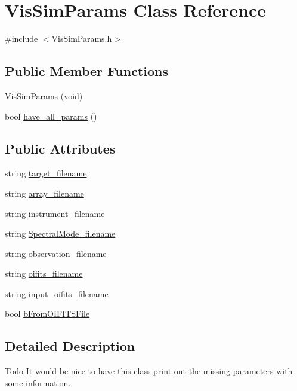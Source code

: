 \hypertarget{classVisSimParams}{
\section{VisSimParams Class Reference}
\label{classVisSimParams}
}


{\ttfamily \#include $<$VisSimParams.h$>$}

\subsection*{Public Member Functions}
\begin{DoxyCompactItemize}
\item 
\hyperlink{classVisSimParams_a3c730d9c8f400a34aade38dbc0b0a675}{VisSimParams} (void)
\item 
bool \hyperlink{classVisSimParams_a39a09952f9e7cdc3dd0f46e1604e5c76}{have\_\-all\_\-params} ()
\end{DoxyCompactItemize}
\subsection*{Public Attributes}
\begin{DoxyCompactItemize}
\item 
string \hyperlink{classVisSimParams_a225b522f1b7e0e07bb3745456693d84d}{target\_\-filename}
\item 
string \hyperlink{classVisSimParams_ad4024dfafa47b1c4246c1885be3bd77e}{array\_\-filename}
\item 
string \hyperlink{classVisSimParams_a1b39663100b7215fc5d8f61d30d85044}{instrument\_\-filename}
\item 
string \hyperlink{classVisSimParams_a5b4b6a34093cd8d538fa32e159477d8e}{SpectralMode\_\-filename}
\item 
string \hyperlink{classVisSimParams_af264c40e20632cfc50ebf48825cb5da8}{observation\_\-filename}
\item 
string \hyperlink{classVisSimParams_ab5550741409f4dbfe5d601194fe7be4b}{oifits\_\-filename}
\item 
string \hyperlink{classVisSimParams_ad590ce822859b9f7b777e30c708872ff}{input\_\-oifits\_\-filename}
\item 
bool \hyperlink{classVisSimParams_ae8c4c4e95792ee06a4198b39516e03fb}{bFromOIFITSFile}
\end{DoxyCompactItemize}


\subsection{Detailed Description}
\begin{Desc}
\item[\hyperlink{todo__todo000020}{Todo}]It would be nice to have this class print out the missing parameters with some information. \end{Desc}


